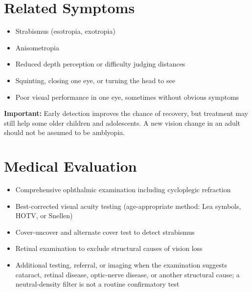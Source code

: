 \section*{Related Symptoms}
\begin{itemize}
 \item Strabismus (esotropia, exotropia)
 \item Anisometropia
 \item Reduced depth perception or difficulty judging distances
 \item Squinting, closing one eye, or turning the head to see
 \item Poor visual performance in one eye, sometimes without obvious symptoms
\end{itemize}
\textbf{Important:} Early detection improves the chance of recovery, but treatment may still help some older children and adolescents. A new vision change in an adult should not be assumed to be amblyopia.

\section*{Medical Evaluation}
\begin{itemize}
 \item Comprehensive ophthalmic examination including cycloplegic refraction
 \item Best-corrected visual acuity testing (age-appropriate method: Lea symbols, HOTV, or Snellen)
 \item Cover-uncover and alternate cover test to detect strabismus
 \item Retinal examination to exclude structural causes of vision loss
 \item Additional testing, referral, or imaging when the examination suggests cataract, retinal disease, optic-nerve disease, or another structural cause; a neutral-density filter is not a routine confirmatory test
\end{itemize}

